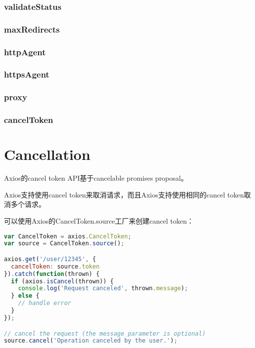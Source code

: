 \subsection{validateStatus}


\subsection{maxRedirects}


\subsection{httpAgent}


\subsection{httpsAgent}


\subsection{proxy}


\subsection{cancelToken}










\chapter{Cancellation}

Axios的cancel token API基于cancelable promises proposal。


Axios支持使用cancel token来取消请求，而且Axios支持使用相同的cancel token取消多个请求。



可以使用Axios的CancelToken.source工厂来创建cancel token：




\begin{lstlisting}[language=JavaScript]
var CancelToken = axios.CancelToken;
var source = CancelToken.source();

axios.get('/user/12345', {
  cancelToken: source.token
}).catch(function(thrown) {
  if (axios.isCancel(thrown)) {
    console.log('Request canceled', thrown.message);
  } else {
    // handle error
  }
});

// cancel the request (the message parameter is optional)
source.cancel('Operation canceled by the user.');
\end{lstlisting}


